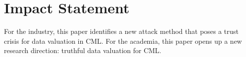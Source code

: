 \section*{Impact Statement}
For the industry, this paper identifies a new attack method that poses a trust crisis for data valuation in CML. 
For the academia, this paper opens up a new research direction: truthful data valuation for CML.

